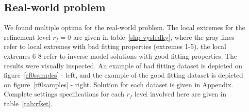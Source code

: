 \documentclass[review,times,3p,10pt]{elsarticle}
\begin{document}




\subsection{Real-world problem}
\label{rworld}

 We found multiple optima for the real-world problem. The local extremes for the refinement level $r_f=0$ are given in table~\ref{shp-vysledky}, where the gray lines refer to local extremes with bad fitting properties (extremes 1-5), the local extremes 6-8 refer to inverse model solutions with good fitting properties. The results were visually inspected. An example of bad fitting dataset is depicted on figure~\ref{rf0samples} - left, and the example of the good fitting dataset is depicted on figure~\ref{rf0samples} - right. Solution for each dataset is  given in Appendix. Complete settings specifications for each $r_f$ level involved here are given in table~\ref{tab:rfset}.
\end{document}
